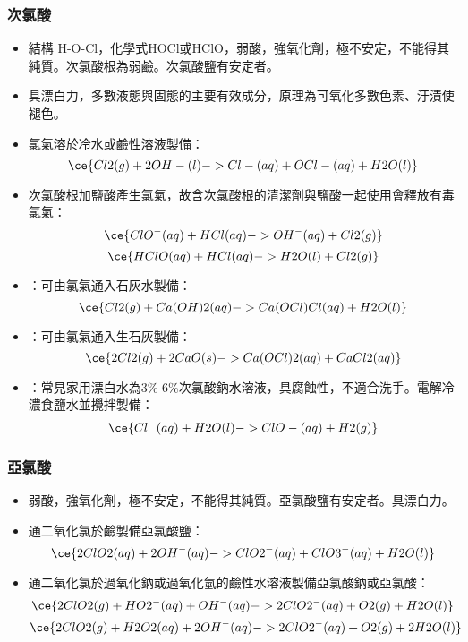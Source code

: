 \documentclass[a4paper,12pt]{report}
\begin{document}
\subsubsection{次氯酸}
\begin{itemize}
\item 結構 H-O-Cl，化學式HOCl或HClO，弱酸，強氧化劑，極不安定，不能得其純質。次氯酸根為弱鹼。次氯酸鹽有安定者。
\item 具漂白力，多數液態與固態的主要有效成分，原理為可氧化多數色素、汙漬使褪色。
\item 氯氣溶於冷水或鹼性溶液製備：
\[\ce{Cl2(g) + 2OH-(l) -> Cl-(aq) + OCl-(aq) + H2O(l)}\]
\item 次氯酸根加鹽酸產生氯氣，故含次氯酸根的清潔劑與鹽酸一起使用會釋放有毒氯氣：
\[\ce{ClO^-(aq) + HCl(aq) -> OH^-(aq) + Cl2(g)}\]
\[\ce{HClO(aq) + HCl(aq) -> H2O(l) + Cl2(g)}\]
\item {}：可由氯氣通入石灰水製備：
\[\ce{Cl2(g) + Ca(OH)2(aq) -> Ca(OCl)Cl(aq) + H2O(l)}\]
\item {}：可由氯氣通入生石灰製備：
\[\ce{2Cl2(g) + 2CaO(s) -> Ca(OCl)2(aq) + CaCl2(aq)}\]
\item {}：常見家用漂白水為3\%-6\%次氯酸鈉水溶液，具腐蝕性，不適合洗手。電解冷濃食鹽水並攪拌製備：
\[\ce{Cl^-(aq) + H2O(l) -> ClO-(aq) + H2(g)}\]
\end{itemize}
\subsubsection{亞氯酸}
\begin{itemize}
\item 弱酸，強氧化劑，極不安定，不能得其純質。亞氯酸鹽有安定者。具漂白力。
\item 通二氧化氯於鹼製備亞氯酸鹽：
\[\ce{2ClO2(aq) + 2OH^-(aq) -> ClO2^-(aq) + ClO3^-(aq) + H2O(l)}\]
\item 通二氧化氯於過氧化鈉或過氧化氫的鹼性水溶液製備亞氯酸鈉或亞氯酸：
\[\ce{2ClO2(g) + HO2^-(aq) + OH^-(aq) -> 2ClO2^-(aq) + O2(g) + H2O(l)}\]
\[\ce{2ClO2(g) + H2O2(aq) + 2OH^-(aq) -> 2ClO2^-(aq) + O2(g) + 2H2O(l)}\]
\end{itemize}
\end{document}
